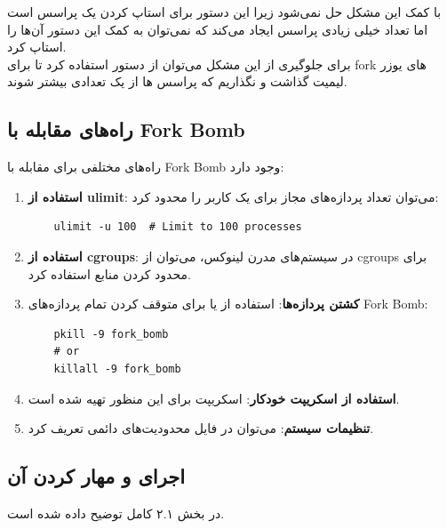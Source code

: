 \documentclass{article}
\begin{document}
با کمک  این مشکل حل نمی‌شود زیرا این دستور برای استاپ کردن یک پراسس است اما  تعداد خیلی زیادی پراسس ایجاد می‌کند که نمی‌توان به کمک این دستور آن‌ها را استاپ کرد.
\\
برای جلوگیری از این مشکل می‌توان از دستور  استفاده کرد تا برای fork های یوزر لیمیت گذاشت و نگذاریم که پراسس ها از یک تعدادی بیشتر شوند.

\subsection{راه‌های مقابله با Fork Bomb}

راه‌های مختلفی برای مقابله با Fork Bomb وجود دارد:

\begin{enumerate}
    \item \textbf{استفاده از ulimit}: می‌توان تعداد پردازه‌های مجاز برای یک کاربر را محدود کرد:
    \begin{LTR}
    \begin{verbatim}
    ulimit -u 100  # Limit to 100 processes
    \end{verbatim}
    \end{LTR}
    \item \textbf{استفاده از cgroups}: در سیستم‌های مدرن لینوکس، می‌توان از cgroups برای محدود کردن منابع استفاده کرد.
    
    \item \textbf{کشتن پردازه‌ها}: استفاده از  یا  برای متوقف کردن تمام پردازه‌های Fork Bomb:
    \begin{LTR}
    \begin{verbatim}
    pkill -9 fork_bomb
    # or
    killall -9 fork_bomb
    \end{verbatim}
    \end{LTR}
    \item \textbf{استفاده از اسکریپت خودکار}: اسکریپت  برای این منظور تهیه شده است.
    
    \item \textbf{تنظیمات سیستم}: می‌توان در فایل  محدودیت‌های دائمی تعریف کرد.
\end{enumerate}

\subsection{اجرای  و مهار کردن آن}
در بخش ۲.۱ کامل توضیح داده شده است.
\end{document}

